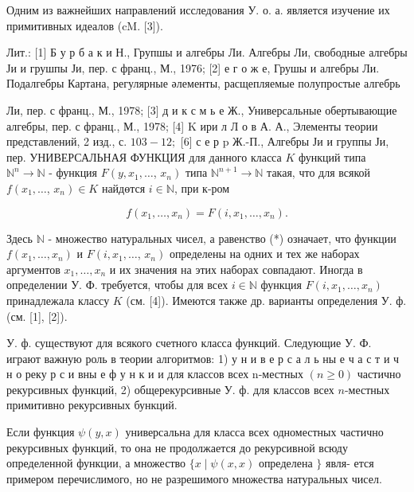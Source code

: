 \documentclass[10pt]{article}
\begin{document}
Одним из важнейших направлений исследования У. о. а. является изучение их примитивных идеалов (cM. [3]).



Лит.: [1] Б у р б а к и Н., Групшы и алгебры Ли. Алгебры Ли, свободные алгебры Ји и грушпы Ји, пер. с франц., М., 1976; [2] е г о ж е, Грушы и алгебры Ли. Подалгебры Картана, регулярные әлементы, расщепляемые полупростые алгебрь

Ли, пер. с франц., М., 1978; [3] д и к с м ь е Ж., Универсальные обертывающие алгебры, пер. с франц., М., 1978; [4] K ири л Л о в А. А., Элементы теории представлений, 2 изд., с. $103-12 ;$ [6] с е р p Ж.-П., Алгебры Ји и группы Ји, пер. УНИВЕРСАЛЬНАЯ ФУНКЦИЯ для данного класса $K$ функций типа $\mathbb{N}^{n} \rightarrow \mathbb{N}$ - функция $F\left(y, x_{1}, \ldots\right.$, $\left.x_{n}\right)$ типа $\mathbb{N}^{n+1} \rightarrow \mathbb{N}$ такая, что для всякой $f\left(x_{1}, \ldots\right.$, $\left.x_{n}\right) \in K$ найдөтся $i \in \mathbb{N}$, при к-ром



\[

f\left(x_{1}, \ldots, x_{n}\right)=F\left(i, x_{1}, \ldots, x_{n}\right) .

\]



Здесь $\mathbb{N}$ - множество натуральных чисел, а равенство (*) означает, что функции $f\left(x_{1}, \ldots, x_{n}\right)$ и $F\left(i, x_{1}, \ldots\right.$, $\left.x_{n}\right)$ определены на одних и тех же наборах аргументов $x_{1}, \ldots, x_{n}$ и их значения на этих наборах совпадают. Иногда в определении У. Ф. требуется, чтобы для всех $i \in \mathbb{N}$ функция $F\left(i, x_{1}, \ldots, x_{n}\right)$ принадлежала классу $K$ (см. [4]). Имеются также др. варианты определения У. ф. (см. [1], [2]).



У. ф. существуют для всякого счетного класса функций. Следующие У. Ф. играют важную роль в теории алгоритмов: 1) у н и в е р с а л ь ны е ч а с т и ч н о реку р с и вны е ф у н к и и для классов всех n-местных $(n \geqslant 0)$ частично рекурсивных функций, 2) общерекурсивные У. ф. для классов всех $n$-местных примитивно рекурсивных бункций.



Если функция $\psi(y, x)$ универсальна для класса всех одноместных частично рекурсивных функций, то она не продолжается до рекурсивной всюду определенной функции, а множество $\{x \mid \psi(x, x)$ определена $\}$ явля- ется примером перечислимого, но не разрешимого множества натуральных чисел.
\end{document}
